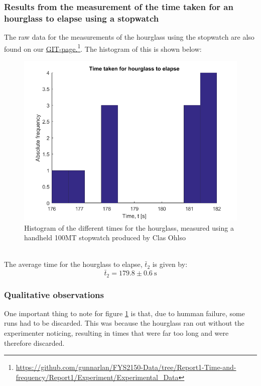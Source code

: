 \documentclass[a4paper, 10pt]{article}
\begin{document}
\subsubsection{Results from the measurement of the time taken for an hourglass to elapse using a stopwatch}
The raw data for the measurements of the hourglass using the stopwatch are also found on our \href{https://github.com/gunnarlan/FYS2150-Data/tree/Report1-Time-and-frequency/Report1/Experiment/Experimental_Data}{GIT-page.}\footnote{\url{https://github.com/gunnarlan/FYS2150-Data/tree/Report1-Time-and-frequency/Report1/Experiment/Experimental_Data}}. The histogram of this is shown below:
\begin{figure}[ht!]
\centering
\includegraphics[scale=0.7]{Experiment2_2.png}
\caption{Histogram of the different times for the hourglass, measured using a handheld 100MT stopwatch produced by Clas Ohlso}\label{fig:Experiment_2_2}
\end{figure}\\
The average time for the hourglass to elapse, $\bar{t}_2$ is given by:
$$\bar{t}_2 = 179.8 \pm 0.6 \ \mathrm{s}$$
\subsubsection{Qualitative observations}\label{Discarding_stopwatch}
One important thing to note for figure \ref{fig:Experiment_2_2} is that, due to humman failure, some runs had to be discarded. This was because the hourglass ran out without the experimenter noticing, resulting in times that were far too long and were therefore discarded.
\end{document}
